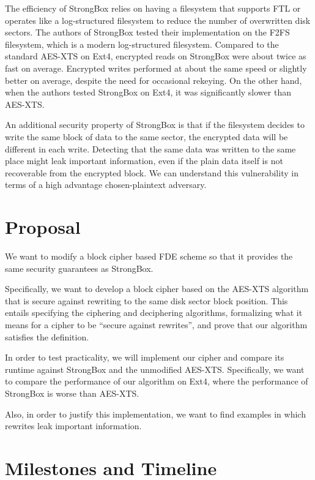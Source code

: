 \documentclass[11pt,twocolumn]{article}
\begin{document}
The efficiency of StrongBox relies on having a filesystem that supports FTL
or operates like a log-structured filesystem to reduce the number of overwritten disk sectors.
The authors of StrongBox tested their implementation on the F2FS filesystem,
which is a modern log-structured filesystem.
Compared to the standard AES-XTS on Ext4,
encrypted reads on StrongBox were about twice as fast on average.
Encrypted writes performed at about the same speed or slightly better on average,
despite the need for occasional rekeying.
On the other hand, when the authors tested StrongBox on Ext4,
it was significantly slower than AES-XTS.

An additional security property of StrongBox
is that if the filesystem decides to write the same block of data to the same sector,
the encrypted data will be different in each write.
Detecting that the same data was written to the same place
might leak important information,
even if the plain data itself is not recoverable from the encrypted block.
We can understand this vulnerability in terms of a high advantage chosen-plaintext adversary.

\section*{Proposal}

We want to modify a block cipher based FDE scheme
so that it provides the same security guarantees as StrongBox.

Specifically,
we want to develop a block cipher based on the AES-XTS algorithm
that is secure against rewriting to the same disk sector block position.
This entails specifying the ciphering and deciphering algorithms,
formalizing what it means for a cipher to be ``secure against rewrites'',
and prove that our algorithm satisfies the definition.

In order to test practicality,
we will implement our cipher
and compare its runtime against StrongBox and the unmodified AES-XTS.
Specifically,
we want to compare the performance of our algorithm on Ext4,
where the performance of StrongBox is worse than AES-XTS.

Also, in order to justify this implementation,
we want to find examples in which rewrites leak important information.

\section*{Milestones and Timeline}
\end{document}
